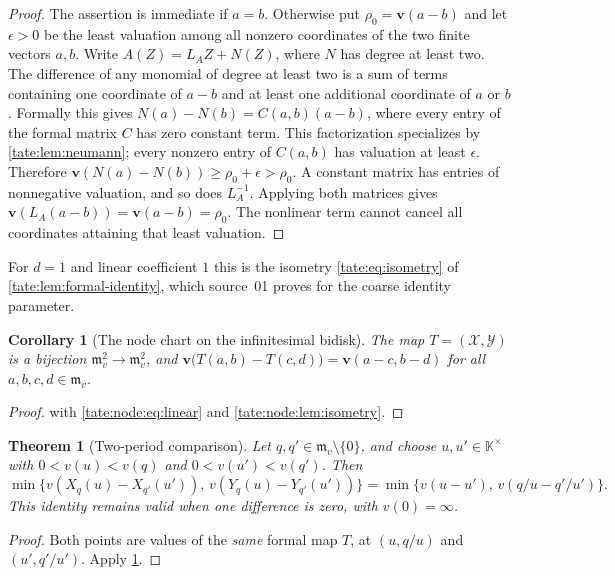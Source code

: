 \documentclass[11pt,letterpaper]{article}
\newtheorem{theorem}{Theorem}[section]
\newtheorem{corollary}[corollary]{Corollary}
\theoremstyle{definition}
\newcommand{\m}{\mathfrak m}
\newcommand{\X}{\mathcal X}
\newcommand{\Y}{\mathcal Y}
\newcommand{\KK}{\mathbb K}
\newcommand{\bv}{\mathbf v}
\begin{document}
\begin{proof}
The assertion is immediate if $a=b$. Otherwise put $\rho_0=\bv(a-b)$ and let
$\epsilon>0$ be the least valuation among all nonzero coordinates of the two
finite vectors $a,b$. Write $A(Z)=L_AZ+N(Z)$, where $N$ has degree at least
two. The difference of any monomial of degree at least two is a sum of terms
containing one coordinate of $a-b$ and at least one additional coordinate of
$a$ or $b$. Formally this gives $N(a)-N(b)=C(a,b)(a-b)$, where every entry of
the formal matrix $C$ has zero constant term. This factorization specializes
by \cref{tate:lem:neumann}; every nonzero entry of $C(a,b)$ has valuation at
least $\epsilon$. Therefore $\bv(N(a)-N(b))\ge\rho_0+\epsilon>\rho_0$.
A constant matrix has entries of nonnegative valuation, and so does
$L_A^{-1}$. Applying both matrices gives $\bv(L_A(a-b))=\bv(a-b)=\rho_0$.
The nonlinear term cannot cancel all coordinates attaining that least
valuation.
\end{proof}

For $d=1$ and linear coefficient $1$ this is the isometry
\eqref{tate:eq:isometry} of \cref{tate:lem:formal-identity}, which
source~01 proves for the coarse identity parameter.

\begin{corollary}[The node chart on the infinitesimal bidisk]\label{tate:node:cor:bidisk}
The map $T=(\X,\Y)$ is a bijection $\m_v^2\to\m_v^2$, and
$\bv\bigl(T(a,b)-T(c,d)\bigr)=\bv(a-c,b-d)$ for all $a,b,c,d\in\m_v$.
\end{corollary}

\begin{proof}
 with \eqref{tate:node:eq:linear} and
\cref{tate:node:lem:isometry}.
\end{proof}

\begin{theorem}[Two-period comparison]\label{tate:node:thm:moving}
Let $q,q'\in\m_v\setminus\{0\}$, and choose $u,u'\in\KK^\times$ with
$0<v(u)<v(q)$ and $0<v(u')<v(q')$. Then
\begin{equation}
 \min\{v(X_q(u)-X_{q'}(u')),\,v(Y_q(u)-Y_{q'}(u'))\}
 =\min\{v(u-u'),\,v(q/u-q'/u')\}.\label{tate:node:eq:moving}
\end{equation}
This identity remains valid when one difference is zero, with
$v(0)=\infty$.
\end{theorem}

\begin{proof}
Both points are values of the \emph{same} formal map $T$, at $(u,q/u)$ and
$(u',q'/u')$. Apply \cref{tate:node:cor:bidisk}.
\end{proof}
\end{document}
